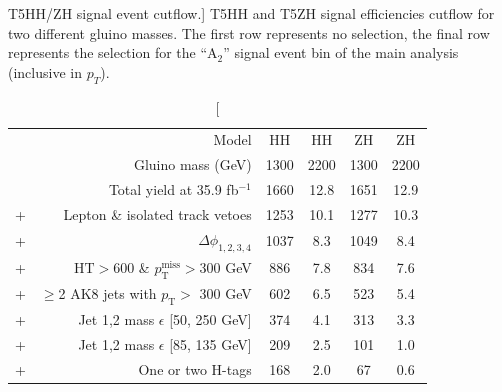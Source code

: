 \begin{table}[hbp!]
\centering
\caption
[T5HH/ZH signal event cutflow.]
{T5HH and T5ZH signal efficiencies cutflow for two different gluino masses. The first row represents no selection, the final row represents the selection for the ``A$_{2}$'' signal event bin of the main analysis (inclusive in $p_{T}$).
}
\label{tab:}
\begin{tabular}{r r c c c c}
\hline
\hline
  & Model                                                                                       & HH & HH & ZH & ZH\\
  & Gluino mass (GeV)                                                               & 1300 & 2200 &1300 & 2200\\
\hline
   & Total yield at 35.9 fb$^{-1}$                        & 1660 & 12.8 & 1651 & 12.9\\
+ & Lepton \& isolated track vetoes                                              & 1253 & 10.1 & 1277 & 10.3\\
+ & $\Delta\phi_{1, 2, 3, 4}$                                                            & 1037 & 8.3 & 1049 & 8.4\\
+ & $\mathrm{HT}>600$ \& $p_{\mathrm{T}}^{\mathrm{miss}}>300$ GeV    & 886 & 7.8 & 834 & 7.6\\
+ & $\geq$2 AK8 jets with $p_{\mathrm{T}}>$ 300 GeV                     & 602 & 6.5 & 523 & 5.4\\
+ & Jet 1,2 mass $\epsilon$ [50, 250 GeV]                                  & 374  & 4.1 & 313 & 3.3\\
+ & Jet 1,2 mass $\epsilon$ [85, 135 GeV]                                  & 209  & 2.5 & 101 & 1.0\\
+ & One or two H-tags                                    & 168  & 2.0 & 67 & 0.6\\%
\hline
\hline
\end{tabular}
\end{table}
